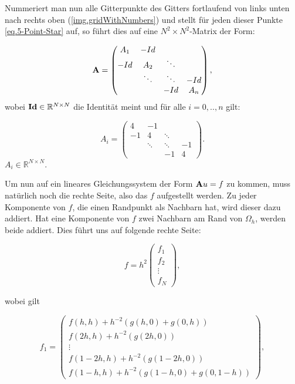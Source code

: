 
Nummeriert man nun alle Gitterpunkte des Gitters fortlaufend von links unten nach rechts oben (\autoref{img.gridWithNumbers}) und stellt für jeden dieser Punkte \autoref{eq.5-Point-Star} auf, so führt dies auf eine $N^{2} \times N^{2}$-Matrix der Form:

\begin{equation}
{\textbf{A}} =
\begin{pmatrix}
A_{1} & -Id \\
-Id & A_{2} & \ddots \\
 & \ddots & \ddots & -Id \\
 & & -Id & A_{n}
\end{pmatrix},\label{eq.2D Matrix}
\end{equation}
wobei ${\textbf{Id}} \in \mathbb{R}^{N \times N}$ die Identität meint und für alle $i = 0,..,n$ gilt:

\begin{equation}
A_{i} = 
\begin{pmatrix}
4 & -1 & & \\
-1 & 4 & \ddots & \\
 & \ddots & \ddots & -1 \\
 & & -1 & 4
\end{pmatrix}.
\end{equation}
$A_{i} \in \mathbb{R}^{N \times N}$.

Um nun auf ein lineares Gleichungssystem der Form ${\textbf{A}}u = f$ zu kommen, muss natürlich noch die rechte Seite, also das $f$ aufgestellt werden. Zu jeder Komponente von $f$, die einen Randpunkt als Nachbarn hat, wird dieser dazu addiert. Hat eine Komponente von $f$ zwei Nachbarn am Rand von $\Omega_{h}$, werden beide addiert. Dies führt uns auf folgende rechte Seite:

\begin{equation}
f = h^{2}
\begin{pmatrix}
f_{1} \\ f_{2} \\ \vdots \\ f_{N}
\end{pmatrix},
\end{equation}

wobei gilt

\begin{equation}
f_{1} = 
\begin{pmatrix}
f(h,h) + h^{-2}(g(h,0)+g(0,h)) \\
f(2h,h) + h^{-2}(g(2h,0)) \\
\vdots \\
f(1-2h,h) + h^{-2}(g(1-2h,0)) \\
f(1-h,h) + h^{-2}(g(1-h,0)+g(0,1-h))
\end{pmatrix},
\end{equation}

